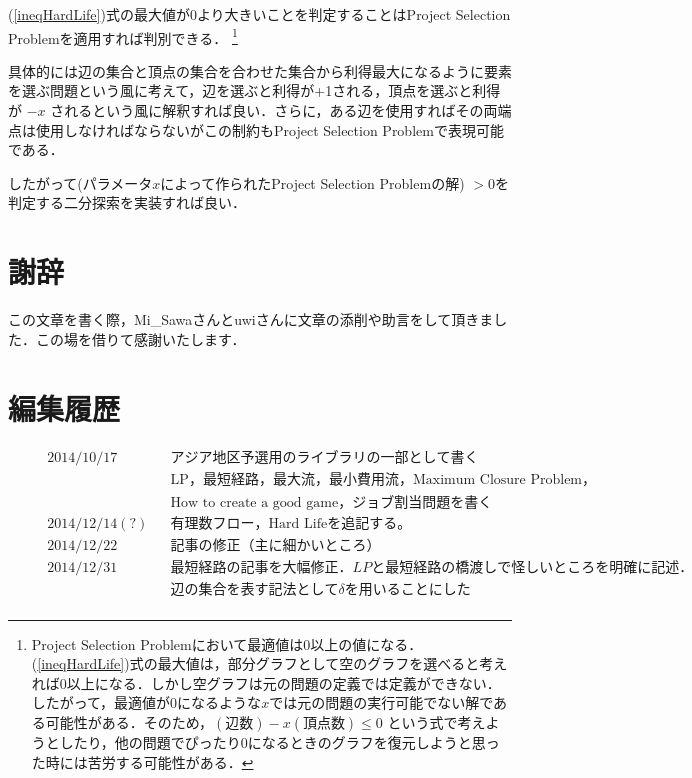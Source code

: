 \documentclass[13pt, a4paper, landscape]{jarticle}
\theoremstyle{nonitalic} %
\begin{document}
(\ref{ineqHardLife})式の最大値が0より大きいことを判定することはProject Selection Problemを適用すれば判別できる． \footnote{ Project Selection Problemにおいて最適値は0以上の値になる．(\ref{ineqHardLife})式の最大値は，部分グラフとして空のグラフを選べると考えれば0以上になる．しかし空グラフは元の問題の定義では定義ができない．したがって，最適値が0になるような$x$では元の問題の実行可能でない解である可能性がある．そのため，$ (\textrm{辺数}) - x (\textrm{頂点数}) \leq 0 $  という式で考えようとしたり，他の問題でぴったり$0$になるときのグラフを復元しようと思った時には苦労する可能性がある．}

具体的には辺の集合と頂点の集合を合わせた集合から利得最大になるように要素を選ぶ問題という風に考えて，辺を選ぶと利得が+1される，頂点を選ぶと利得が $-x$ されるという風に解釈すれば良い．さらに，ある辺を使用すればその両端点は使用しなければならないがこの制約もProject Selection Problemで表現可能である． 

したがって(パラメータ$x$によって作られたProject Selection Problemの解) $>0$を判定する二分探索を実装すれば良い． 





\section*{謝辞}
この文章を書く際，Mi\_Sawaさんとuwiさんに文章の添削や助言をして頂きました．この場を借りて感謝いたします．

\section*{編集履歴}
\begin{align*}
  &&& 2014/10/17 && アジア地区予選用のライブラリの一部として書く &&&\\
  &&&            && \mathrm{LP}， 最短経路， 最大流， 最小費用流， \textrm{Maximum Closure Problem}， \\
  &&&            &&\textrm{How to create a good game}， ジョブ割当問題を書く \\
  &&& 2014/12/14(?) && 有理数フロー， \textrm{Hard Life}を追記する。 \\
  &&& 2014/12/22    && 記事の修正（主に細かいところ）\\
  &&& 2014/12/31    && 最短経路の記事を大幅修正．LPと最短経路の橋渡しで怪しいところを明確に記述．\\
  &&&               && 辺の集合を表す記法として \delta を用いることにした\\
\end{align*}
\end{document}

